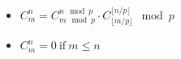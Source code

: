 \begin{itemize}
    \item $C^n_m = C^{n \mod p}_{m \mod p} \cdot C^{\lfloor n / p \rfloor}_{\lfloor m / p \rfloor} \mod p$
    \item $C^n_m = 0 ~ \text{if} ~ m \le n$
\end{itemize}
